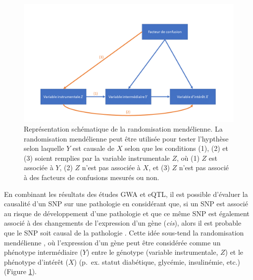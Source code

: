 \documentclass[11pt,a4paper,notrimn]{krantz}
\theoremstyle{definition}
\theoremstyle{definition}
\theoremstyle{remark}
\begin{document}
\begin{figure}[!htb]

{\centering \includegraphics[width=6in]{FiguresTables/MR} 

}

\caption{Représentation schématique de la randomisation mendélienne. La
randomisation mendélienne peut être utilisée pour tester l'hypthèse
selon laquelle \(Y\) est causale de \(X\) selon que les conditions (1),
(2) et (3) soient remplies par la variable instrumentale \(Z\), où (1)
\(Z\) est associée à \(Y\), (2) \(Z\) n'est pas associée à \(X\), et (3)
\(Z\) n'est pas associé à des facteurs de confusions mesurés ou non.}\label{fig:MR}
\end{figure}

En combinant les résultats des études GWA et eQTL, il est possible
d'évaluer la causalité d'un SNP sur une pathologie en considérant que,
si un SNP est associé au risque de développement d'une pathologie et que
ce même SNP est également associé à des changements de l'expression d'un
gène (\emph{cis}), alors il est probable que le SNP soit causal de la
pathologie
\citep{nica_candidate_2010, schadt_integrative_2005, zhu_increasing_2007, chang_genome-wide_2016}.
Cette idée sous-tend la randomisation mendélienne
\citep{lawlor_mendelian_2008}, où l'expression d'un gène peut être
considérée comme un phénotype intermédiaire (\(Y\)) entre le génotype
(variable instrumentale, \(Z\)) et le phénotype d'intérêt (\(X\))
(p.~ex. statut diabétique, glycémie, insulinémie, etc.) (Figure
\ref{fig:MR}).
\end{document}
